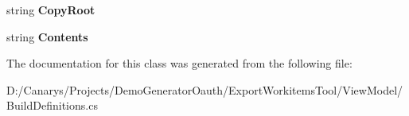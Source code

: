 \begin{DoxyCompactItemize}
\item 
\mbox{\label{class_templates_generator_tool_1_1_view_model_1_1_build_definitions_1_1_inputs_a36c295332dd54f0a308c49c493b8419e}} 
string {\bfseries Copy\+Root}
\item 
\mbox{\label{class_templates_generator_tool_1_1_view_model_1_1_build_definitions_1_1_inputs_a4ecf5e43c3e8ab3d224595550d331f22}} 
string {\bfseries Contents}
\end{DoxyCompactItemize}


The documentation for this class was generated from the following file\+:\begin{DoxyCompactItemize}
\item 
D\+:/\+Canarys/\+Projects/\+Demo\+Generator\+Oauth/\+Export\+Workitems\+Tool/\+View\+Model/Build\+Definitions.\+cs\end{DoxyCompactItemize}
